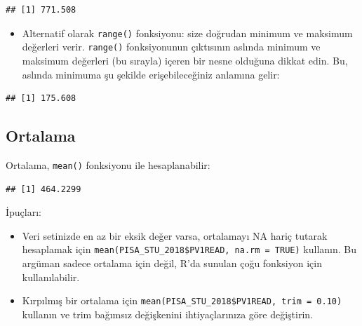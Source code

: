 \documentclass[
  oneside]{book}
\newenvironment{Shaded}{\begin{snugshade}}{\end{snugshade}}
\newcommand{\DecValTok}[1]{\textcolor[rgb]{0.00,0.00,0.81}{#1}}
\newcommand{\FunctionTok}[1]{\textcolor[rgb]{0.13,0.29,0.53}{\textbf{#1}}}
\newcommand{\NormalTok}[1]{#1}
\newcommand{\SpecialCharTok}[1]{\textcolor[rgb]{0.81,0.36,0.00}{\textbf{#1}}}
\providecommand{\tightlist}{%
  \setlength{\itemsep}{0pt}\setlength{\parskip}{0pt}}
\begin{document}
\begin{Shaded}
\end{Shaded}

\begin{verbatim}
## [1] 771.508
\end{verbatim}

\begin{itemize}
\tightlist
\item
  Alternatif olarak \texttt{range()} fonksiyonu: size doğrudan minimum ve maksimum değerleri verir. \texttt{range()} fonksiyonunun çıktısının aslında minimum ve maksimum değerleri (bu sırayla) içeren bir nesne olduğuna dikkat edin. Bu, aslında minimuma şu şekilde erişebileceğiniz anlamına gelir:
\end{itemize}

\begin{Shaded}
\end{Shaded}

\begin{verbatim}
## [1] 175.608
\end{verbatim}

\hypertarget{ortalama}{%
\subsection{Ortalama}\label{ortalama}}

Ortalama, \texttt{mean()} fonksiyonu ile hesaplanabilir:

\begin{Shaded}
\end{Shaded}

\begin{verbatim}
## [1] 464.2299
\end{verbatim}

\begin{info}

İpuçları:

\begin{itemize}
\tightlist
\item
  Veri setinizde en az bir eksik değer varsa, ortalamayı NA hariç tutarak hesaplamak için \texttt{mean(PISA\_STU\_2018\$PV1READ,\ na.rm\ =\ TRUE)} kullanın. Bu argüman sadece ortalama için değil, R'da sunulan çoğu fonksiyon için kullanılabilir.
\item
  Kırpılmış bir ortalama için \texttt{mean(PISA\_STU\_2018\$PV1READ,\ trim\ =\ 0.10)} kullanın ve trim bağımsız değişkenini ihtiyaçlarınıza göre değiştirin.
\end{itemize}

\end{info}
\end{document}
